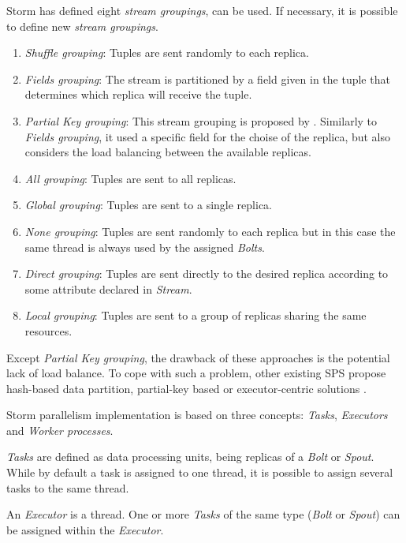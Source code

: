Storm has defined eight \textit{stream groupings}, can be used. If necessary, it is possible to define new \textit{stream groupings}.

\begin{enumerate}
\item \textit{Shuffle grouping}: Tuples are sent randomly to each replica.
\item \textit{Fields grouping}: The stream is partitioned by a field given in the tuple that determines which replica will receive the tuple.
\item \textit{Partial Key grouping}: This stream grouping is proposed by \cite{NasirMGKS15}. Similarly to \textit{Fields grouping}, it used a specific field for the choise of the replica, but also considers the load balancing between the available replicas.
\item \textit{All grouping}: Tuples are sent to all replicas.
\item \textit{Global grouping}: Tuples are sent to a single replica.
\item \textit{None grouping}: Tuples are sent randomly to each replica but in this case the same thread is always used by the assigned \textit{Bolts}.
\item \textit{Direct grouping}: Tuples are sent directly to the desired replica according to some attribute declared in \textit{Stream}.
\item \textit{Local grouping}: Tuples are sent to a group of replicas sharing the same resources.
\end{enumerate}

Except \textit{Partial Key grouping}, the drawback of these approaches is the potential lack of load balance. To cope with such a problem, other existing SPS propose hash-based data partition\citep{ShahHCF03}, partial-key based \citep{NasirMGKS15} or executor-centric solutions \citep{WangFMWZ19}.

Storm parallelism implementation is based on three concepts: \textit{Tasks}, \textit{Executors} and \textit{Worker processes}.

\textit{Tasks} are defined as data processing units, being replicas of a \textit{Bolt} or \textit{Spout}. While by default a task is assigned to one thread, it is possible to assign several tasks to the same thread.

An \textit{Executor} is a thread. One or more \textit{Tasks} of the same type (\textit{Bolt} or \textit{Spout}) can be assigned within the \textit{Executor}.

